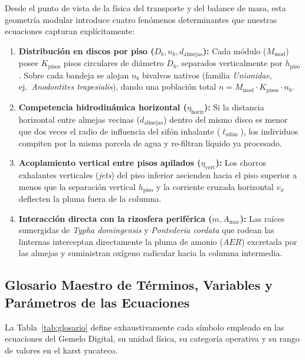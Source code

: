 \documentclass[11pt,letterpaper]{article}
\begin{document}
Desde el punto de vista de la física del transporte y del balance de masa, esta geometría modular introduce cuatro fenómenos determinantes que nuestras ecuaciones capturan explícitamente:
\begin{enumerate}[leftmargin=1.5em]
    \item \textbf{Distribución en discos por piso ($D_b, n_b, d_{\text{almejas}}$):} Cada módulo ($M_{\text{mod}}$) posee $K_{\text{pisos}}$ pisos circulares de diámetro $D_b$, separados verticalmente por $h_{\text{piso}}$. Sobre cada bandeja se alojan $n_b$ bivalvos nativos (familia \textit{Unionidae}, ej.\ \textit{Anodontites trapesialis}), dando una población total $n = M_{\text{mod}} \cdot K_{\text{pisos}} \cdot n_b$.
    \item \textbf{Competencia hidrodinámica horizontal ($\eta_{\text{horiz}}$):} Si la distancia horizontal entre almejas vecinas ($d_{\text{almejas}}$) dentro del mismo disco es menor que dos veces el radio de influencia del sifón inhalante ($\ell_{\text{sifón}}$), los individuos compiten por la misma parcela de agua y re-filtran líquido ya procesado.
    \item \textbf{Acoplamiento vertical entre pisos apilados ($\eta_{\text{vert}}$):} Los chorros exhalantes verticales (\textit{jets}) del piso inferior ascienden hacia el piso superior a menos que la separación vertical $h_{\text{piso}}$ y la corriente cruzada horizontal $v_x$ deflecten la pluma fuera de la columna.
    \item \textbf{Interacción directa con la rizosfera periférica ($m, A_{\text{mac}}$):} Las raíces sumergidas de \textit{Typha domingensis} y \textit{Pontederia cordata} que rodean las linternas interceptan directamente la pluma de amonio ($AER$) excretada por las almejas y suministran oxígeno radicular hacia la columna intermedia.
\end{enumerate}

\subsection{Glosario Maestro de Términos, Variables y Parámetros de las Ecuaciones}
La Tabla~\ref{tab:glosario} define exhaustivamente cada símbolo empleado en las ecuaciones del Gemelo Digital, su unidad física, su categoría operativa y su rango de valores en el karst yucateco.
\end{document}
